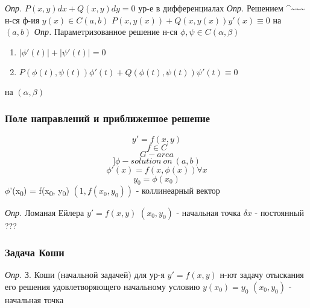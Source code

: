 \documentclass[11pt]{article}
\begin{document}
\emph{Опр.} \(P(x, y)dx + Q(x, y)dy = 0\)
ур-е в дифференциалах
\emph{Опр.} Решением \^{}\textasciitilde{}\textasciitilde{}\textasciitilde{} н-ся ф-ия \(y(x) \in C(a, b)\)
\(P(x, y(x)) + Q(x, y(x))y'(x) \equiv 0\) на \((a, b)\)
\emph{Опр.} Параметризованное решение н-ся \(\phi, \psi \in C(\alpha, \beta)\)
\begin{enumerate}
\item \(|\phi'(t)| + |\psi'(t)| = 0\)
\item \(P(\phi(t), \psi(t))\phi'(t) + Q(\phi(t), \psi(t))\psi'(t) \equiv 0\)
\end{enumerate}
на \((\alpha, \beta)\)
\subsubsection{Поле направлений и приближенное решение}
\label{sec:orgc7e8705}
\[y' = f(x, y)\]
\[f \in C\]
\[G - area\]
\[] \phi - solution\ on\ (a,b)\]
\[\phi'(x) = f(x, \phi(x)) \forall x\]
\[y_0 = \phi(x_0)\]
\(\phi\)'(x\textsubscript{0}) = f(x\textsubscript{0}, y\textsubscript{0})
\((1, f(x_0, y_0))\) - коллинеарный вектор

\emph{Опр.} Ломаная Ейлера
\(y' = f(x,y)\)
\((x_0, y_0)\) - начальная точка
\(\delta x\) - постоянный ???
\subsubsection{Задача Коши}
\label{sec:org3824dfc}
\emph{Опр.} З. Коши (начальной задачей) 
для ур-я \(y' = f(x,y)\) н-ют задачу отыскания его решения удовлетворяющего начальному условию
\(y(x_0) = y_0\)
\((x_0, y_0)\) - начальная точка
\end{document}
